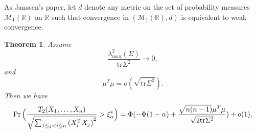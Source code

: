 \documentclass[review]{elsarticle}
\theoremstyle{plain}
\newtheorem{theorem}{\quad\quad Theorem}
\theoremstyle{definition}
\theoremstyle{remark}
\begin{document}
As Janssen's paper, let $d$ denote any metric on the set of probability measures $\mathcal{M}_1(\mathbb{R})$ on $\mathbb{R}$ such that convergence in $(\mathcal{M}_1(\mathbb{R}),d)$ is equivalent to weak convergence.
\begin{theorem}
    Assume
    \begin{equation}\label{chenCondition}
        \frac{\lambda_{\max}^2(\Sigma)}{\mathrm{tr}\Sigma^2}\to 0,
    \end{equation}
    and
    \begin{equation}
        \mu^T\mu=o(\sqrt{\mathrm{tr}\Sigma^2}).
    \end{equation}
    Then we have
    \begin{equation}
            \Pr\Big(\frac{T_2( X_1,\ldots, X_n)}{\sqrt{\sum_{1\leq j<i\leq n}{(X_i^T X_j)}^2}}>\xi_{\alpha}^* \Big)\\
            =
            \Phi(-\Phi(1-\alpha)+\frac{\sqrt{n(n-1)}\mu^T\mu}{\sqrt{2\mathrm{tr}\Sigma^2}})+o(1),
    \end{equation}
\end{theorem}
\end{document}
